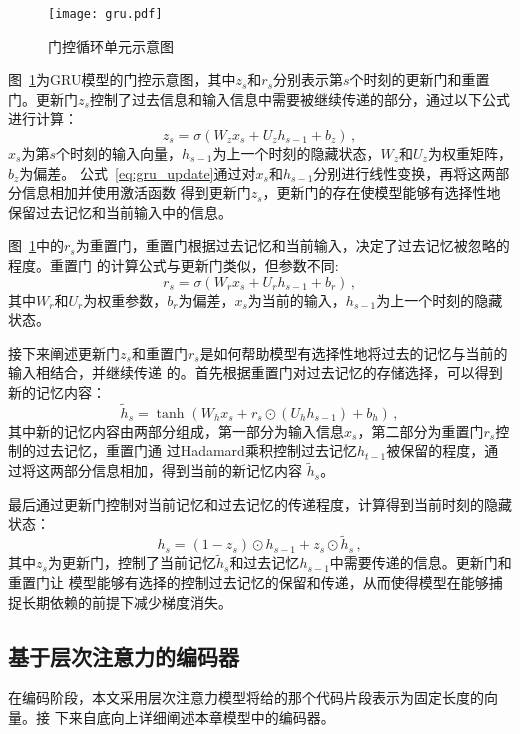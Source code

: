 \begin{figure} [!t]
	\centering
	\texttt{[image: gru.pdf]}
	\caption{门控循环单元示意图}
	\label{fig:gru}
\end{figure}

图~\ref{fig:gru}为GRU模型的门控示意图，其中$z_s$和$r_s$分别表示第$s$个时刻的更新门和重置门。更新门$z_s$控制了过去信息和输入信息中需要被继续传递的部分，通过以下公式进行计算：
\begin{equation}
    z_s = \sigma (W_z x_s + U_z h_{s-1} + b_z) \,,
    \label{eq:gru_update}
\end{equation}
$x_s$为第$s$个时刻的输入向量，$h_{s-1}$为上一个时刻的隐藏状态，$W_z$和$U_z$为权重矩阵，$b_z$为偏差。
公式~\eqref{eq:gru_update}通过对$x_s$和$h_{s-1}$分别进行线性变换，再将这两部分信息相加并使用激活函数
得到更新门$z_s$，更新门的存在使模型能够有选择性地保留过去记忆和当前输入中的信息。

图~\ref{fig:gru}中的$r_s$为重置门，重置门根据过去记忆和当前输入，决定了过去记忆被忽略的程度。重置门
的计算公式与更新门类似，但参数不同:
\begin{equation}
    r_s = \sigma (W_r x_s + U_r h_{s-1} + b_r) \,,
    \label{eq:gru_ret}
\end{equation}
其中$W_r$和$U_r$为权重参数，$b_r$为偏差，$x_s$为当前的输入，$h_{s-1}$为上一个时刻的隐藏状态。

接下来阐述更新门$z_s$和重置门$r_s$是如何帮助模型有选择性地将过去的记忆与当前的输入相结合，并继续传递
的。首先根据重置门对过去记忆的存储选择，可以得到新的记忆内容：
\begin{equation}
    \tilde{h}_s = \tanh (W_h x_s + r_s \odot (U_h h_{s-1}) + b_h) \,,
    \label{eq:gru_cand}
\end{equation}
其中新的记忆内容由两部分组成，第一部分为输入信息$x_s$，第二部分为重置门$r_s$控制的过去记忆，重置门通
过Hadamard乘积控制过去记忆$h_{t-1}$被保留的程度，通过将这两部分信息相加，得到当前的新记忆内容
$\tilde{h}_s$。

最后通过更新门控制对当前记忆和过去记忆的传递程度，计算得到当前时刻的隐藏状态：
\begin{equation}
	h_s = (1-z_s) \odot h_{s-1} + z_s \odot \tilde{h}_s \,,
    \label{eq:gru_h}
\end{equation}
其中$z_s$为更新门，控制了当前记忆$\tilde{h}_s$和过去记忆$h_{s-1}$中需要传递的信息。更新门和重置门让
模型能够有选择的控制过去记忆的保留和传递，从而使得模型在能够捕捉长期依赖的前提下减少梯度消失。

\subsection{基于层次注意力的编码器}
在编码阶段，本文采用层次注意力模型将给的那个代码片段表示为固定长度的向量。接
下来自底向上详细阐述本章模型中的编码器。

